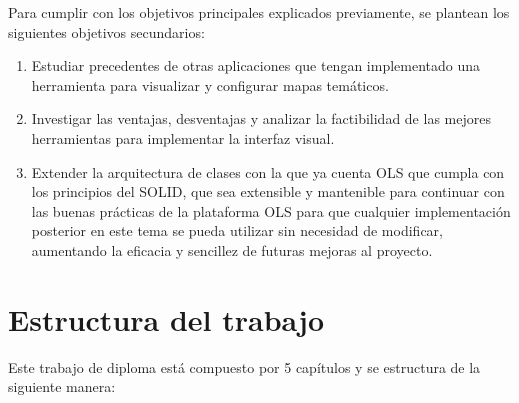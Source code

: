 Para cumplir con los objetivos principales explicados previamente, se plantean los siguientes objetivos secundarios:

\begin{enumerate}
\item Estudiar precedentes de otras aplicaciones que tengan implementado una herramienta para visualizar y configurar mapas tem\'aticos.
\item Investigar las ventajas, desventajas y analizar la factibilidad de las mejores herramientas para implementar la interfaz visual.
\item Extender la arquitectura de clases con la que ya cuenta OLS que cumpla con los principios del SOLID, que sea extensible y mantenible para continuar con las buenas pr\'acticas de la plataforma OLS para que cualquier implementaci\'on posterior en este tema se pueda utilizar sin necesidad de modificar, aumentando la eficacia y sencillez de futuras mejoras al proyecto.
\end{enumerate}


\section{Estructura del trabajo}
Este trabajo de diploma est\'a compuesto por 5 cap\'itulos y se estructura de la siguiente manera:

